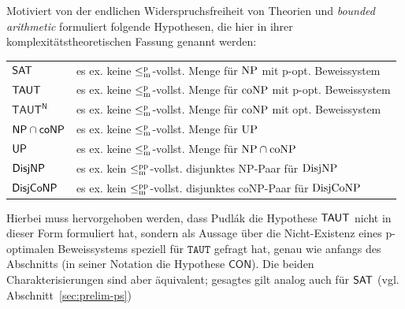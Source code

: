Motiviert von der endlichen Widerspruchsfreiheit von Theorien und \emph{bounded arithmetic} formuliert \textcite{pudlak_incompleteness_2017} folgende Hypothesen, die hier in ihrer komplexitätstheoretischen Fassung genannt werden:\par
\bigskip
\begin{tabular}{l@{\quad:\quad}l}
    $\mathsf{SAT}$ & es ex. keine $\leq_\mathrm{m}^\mathrm{p}$-vollst. Menge für $\mathrm{NP}$ mit p-opt. Beweissystem\\
    $\mathsf{TAUT}$ & es ex. keine $\leq_\mathrm{m}^\mathrm{p}$-vollst. Menge für $\mathrm{coNP}$ mit p-opt. Beweissystem\\
    $\mathsf{TAUT^N}$ & es ex. keine $\leq_\mathrm{m}^\mathrm{p}$-vollst. Menge für $\mathrm{coNP}$ mit opt. Beweissystem\\
    $\mathsf{NP}{}\cap{}\mathsf{coNP}$ & es ex. keine $\leq_\mathrm{m}^\mathrm{p}$-vollst. Menge für $\mathrm{UP}$\\
    $\mathsf{UP}$ & es ex. keine $\leq_\mathrm{m}^\mathrm{p}$-vollst. Menge für $\mathrm{NP}\cap\mathrm{coNP}$\\
    $\mathsf{DisjNP}$ & es ex. kein $\leq_\mathrm{m}^\mathrm{pp}$-vollst. disjunktes NP-Paar für $\mathrm{DisjNP}$\\
    $\mathsf{DisjCoNP}$ & es ex. kein $\leq_\mathrm{m}^\mathrm{pp}$-vollst. disjunktes coNP-Paar für $\mathrm{DisjCoNP}$
\end{tabular}\par
\bigskip\noindent
Hierbei muss hervorgehoben werden, dass Pudlák die Hypothese $\mathsf{TAUT}$ nicht in dieser Form formuliert hat, sondern als Aussage über die Nicht-Existenz eines p-optimalen Beweissystems speziell für $\mathtt{TAUT}$ gefragt hat, genau wie anfangs des Abschnitts (in seiner Notation die Hypothese $\mathsf{CON}$). Die beiden Charakterisierungen sind aber äquivalent; gesagtes gilt analog auch für $\mathsf{SAT}$ (vgl. Abschnitt~\ref{sec:prelim-ps})

